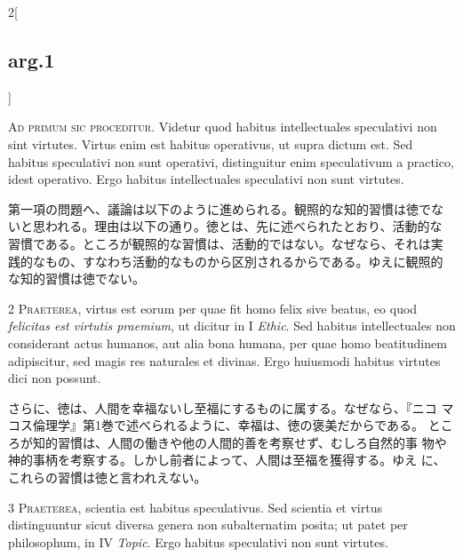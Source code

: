 \documentclass[paper=a4paper,fontsize=10pt,jafontsize=9pt,titlepage]{jlreq}
\begin{document}
\begin{paracol}{2}[\subsection{arg.1}]

{\huge A}{\scshape d primum sic proceditur}.  Videtur quod habitus
intellectuales speculativi non sint virtutes. Virtus enim est habitus
operativus, ut supra dictum est. Sed habitus speculativi non sunt
operativi, distinguitur enim speculativum a practico, idest
operativo. Ergo habitus intellectuales speculativi non sunt virtutes.

\switchcolumn

第一項の問題へ、議論は以下のように進められる。観照的な知的習慣は徳でな
いと思われる。理由は以下の通り。徳とは、先に述べられたとおり、活動的な
習慣である。ところが観照的な習慣は、活動的ではない。なぜなら、それは実
践的なもの、すなわち活動的なものから区別されるからである。ゆえに観照的
な知的習慣は徳でない。


{\scshape 2 Praeterea}, virtus est eorum per quae fit homo felix sive
 beatus, eo quod {\itshape felicitas est virtutis praemium}, ut
 dicitur in I {\itshape Ethic}. Sed habitus intellectuales non
 considerant actus humanos, aut alia bona humana, per quae homo
 beatitudinem adipiscitur, sed magis res naturales et divinas. Ergo
 huiusmodi habitus virtutes dici non possunt.

\switchcolumn

さらに、徳は、人間を幸福ないし至福にするものに属する。なぜなら、『ニコ
マコス倫理学』第1巻で述べられるように、幸福は、徳の褒美だからである。
ところが知的習慣は、人間の働きや他の人間的善を考察せず、むしろ自然的事
物や神的事柄を考察する。しかし前者によって、人間は至福を獲得する。ゆえ
に、これらの習慣は徳と言われえない。


{\scshape 3 Praeterea}, scientia est habitus speculativus. Sed
 scientia et virtus distinguuntur sicut diversa genera non
 subalternatim posita; ut patet per philosophum, in IV {\itshape
 Topic}. Ergo habitus speculativi non sunt virtutes.


\end{paracol}
\end{document}
